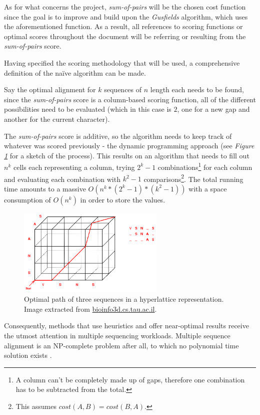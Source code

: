 \documentclass[twoside,openright,titlepage,numbers=noenddot,headinclude,%
                footinclude=true,cleardoublepage=empty,abstractoff, %
                BCOR=5mm,paper=a4,fontsize=11pt,%
                ngerman,american,%
                ]{scrreprt}
\begin{document}
As for what concerns the project, \textit{sum-of-pairs} will be the chosen cost function since the goal is to improve and build upon the \textit{Gusfields} algorithm, which uses the aforementioned function. As a result, all references to scoring functions or optimal scores throughout the document will be referring or resulting from the \textit{sum-of-pairs} score.

Having specified the scoring methodology that will be used, a comprehensive definition of the naïve algorithm can be made.

Say the optimal alignment for $k$ sequences of $n$ length each needs to be found, since the \textit{sum-of-pairs} score is a column-based scoring function, all of the different possibilities need to be evaluated (which in this case is $2$, one for a new gap and another for the current character). 

The \textit{sum-of-pairs} score is additive, so the algorithm needs to keep track of whatever was scored previously - the dynamic programming approach (see \textit{Figure \ref{fig:dp-msa}} for a sketch of the process). This results on an algorithm that needs to fill out $n^{k}$ cells each representing a column, trying $2^{k}-1$ combinations\footnote{A column can't be completely made up of gaps, therefore one combination has to be subtracted from the total.} for each column and evaluating each combination with $k^{2}-1$ comparisons\footnote{This assumes $cost(A,B) = cost(B,A)$.}. The total running time amounts to a massive $O(n^{k} * (2^{k}-1) * (k^{2}-1))$ with a space consumption of $O(n^{k})$ in order to store the values.

\begin{figure}
    \centering
    \includegraphics[width=7cm]{report/dp-msa.png}
    \caption{Optimal path of three sequences in a hyperlattice representation. Image extracted from \url{bioinfo3d.cs.tau.ac.il}.}
    \label{fig:dp-msa}
\end{figure}
 
Consequently, methods that use heuristics and offer near-optimal results receive the utmost attention in multiple sequencing workloads. Multiple sequence alignment is an NP-complete problem after all, to which no polynomial time solution exists \cite{cornell-msa}.
\end{document}
